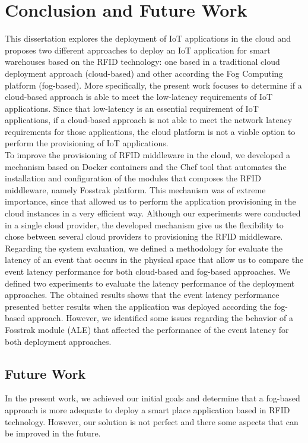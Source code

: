 

\section{Conclusion and Future Work}
\label{sec:conclusion}
This dissertation explores the deployment of \gls{IoT} applications in the cloud and proposes
two different approaches to deploy an \gls{IoT} application for smart warehouses based on the
\gls{RFID} technology: one based in a traditional cloud deployment approach (cloud-based) and other
according the Fog Computing platform (fog-based). More specifically, the present work focuses to
determine if a cloud-based approach is able to meet the low-latency requirements of \gls{IoT}
applications. Since that low-latency is an essential requirement of \gls{IoT} applications, if a
cloud-based approach is not able to meet the network latency requirements for those applications,
the cloud platform is not a viable option to perform the provisioning of \gls{IoT} applications.\\

To improve the provisioning of \gls{RFID} middleware in the cloud, we developed a mechanism based on
Docker containers and the Chef tool that automates the installation and configuration of the modules
that composes the \gls{RFID} middleware, namely Fosstrak platform. This mechanism was of extreme
importance, since that allowed us to perform the application provisioning in the cloud instances in
a very efficient way. Although our experiments were conducted in a single cloud provider, the developed
mechanism give us the flexibility to chose between several cloud providers to provisioning the \gls{RFID} middleware.\\

Regarding the system evaluation, we defined a methodology for evaluate the latency of an event that
occurs in the physical space that allow us to compare the event latency performance for both cloud-based
and fog-based approaches. We defined two experiments to evaluate the latency performance of the
deployment approaches. The obtained results shows that the event latency performance presented better
results when the application was deployed according the fog-based approach. However, we identified
some issues regarding the behavior of a Fosstrak module (\gls{ALE}) that affected the performance
of the event latency for both deployment approaches.

\subsection{Future Work}
\label{sub:future_work}
In the present work, we achieved our initial goals and determine that a fog-based approach is more
adequate to deploy a smart place application based in \gls{RFID} technology. However, our solution
is not perfect and there some aspects that can be improved in the future.\\

